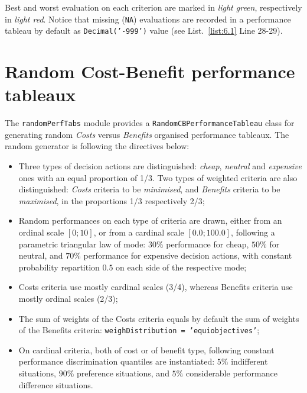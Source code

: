Best and worst evaluation on each criterion are marked in \emph{light green}, respectively in \emph{light red}. Notice that missing (\texttt{NA}) evaluations are recorded in a performance tableau by default as \texttt{Decimal('-999')} value (see List.~\vref{list:6.1} Line 28-29).	    

\section{Random Cost-Benefit performance tableaux}
\label{sec:6.3}

The \texttt{randomPerfTabs} module provides a \texttt{RandomCBPerformanceTableau} class for generating random \emph{Costs} versus \emph{Benefits} organised performance tableaux. The random generator is following the directives below:
\begin{itemize}[leftmargin=0.5cm,rightmargin=0.25cm]
\item Three types of decision actions are distinguished: \emph{cheap}, \emph{neutral} and \emph{expensive} ones with an equal proportion of 1/3. Two types of weighted criteria are also distinguished: \emph{Costs} criteria to be \emph{minimised}, and \emph{Benefits} criteria to be \emph{maximised}, in the proportions 1/3 respectively 2/3;
\item  Random performances on each type of criteria  are drawn, either from an ordinal scale $[0;10]$, or from a cardinal scale $[0.0;100.0]$, following a parametric triangular law of mode: $30\%$ performance for cheap, $50\%$ for neutral, and $70\%$ performance for expensive decision actions, with constant probability repartition $0.5$ on each side of the respective mode;
\item Costs criteria use mostly cardinal scales (3/4), whereas Benefits criteria use mostly ordinal scales (2/3); 
\item  The sum of weights of the Costs criteria equals by default the sum of weights of the Benefits criteria: \texttt{weighDistribution = 'equiobjectives'};
\item On cardinal criteria, both of cost or of benefit type, following constant performance discrimination quantiles are instantiated: $5\%$ indifferent situations, $90\%$ preference situations, and $5\%$ considerable performance difference situations. 
\end{itemize}

